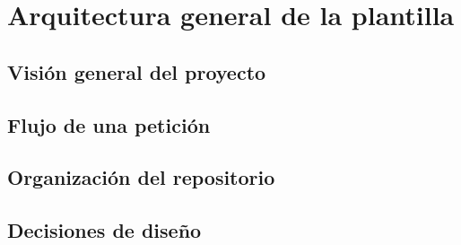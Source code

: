 \chapter{Arquitectura general de la plantilla}
\section{Visi\'on general del proyecto}
\section{Flujo de una petici\'on}
\section{Organizaci\'on del repositorio}
\section{Decisiones de diseño}